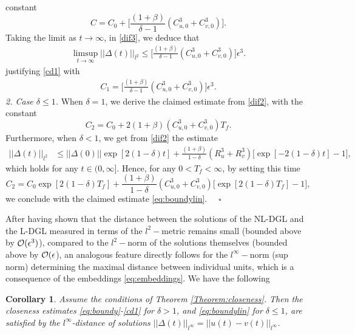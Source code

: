 \documentclass[preprintnumbers,amsmath,amssymb]{revtex4}
\newtheorem{corollary}{Corollary}[section]
\begin{document}
constant 
\begin{equation}
\label{cdc0}
C=C_0+\bigg[\frac{(1+\beta)}{\delta-1}(C_{u,0}^3+C_{v,0}^3)\bigg].
\end{equation}
Taking the limit as $t\rightarrow\infty$,  in \eqref{dif3}, we deduce that
\begin{eqnarray*}
\limsup_{t\rightarrow\infty}||\Delta(t)||_{l^2}\leq \bigg[\frac{(1+\beta)}{\delta-1}(C_{u,0}^3+C_{v,0}^3)\bigg]\epsilon^3.
\end{eqnarray*}
justifying \eqref{cd1} with
\begin{eqnarray}
\label{cdc}
C_1=\bigg[\frac{(1+\beta)}{\delta-1}(C_{u,0}^3+C_{v,0}^3)\bigg]\epsilon^3.
\end{eqnarray}
\textit{2. Case $\delta\leq 1$.}  When $\delta=1$, we derive the claimed estimate from \eqref{dif2}, with the constant 
\begin{equation*}
C_2=C_0+2(1+\beta)(C_{u,0}^3+C_{v,0}^3)T_f.
\end{equation*}
Furthermore, when $\delta<1$, we get from \eqref{dif2} the estimate
\begin{equation}
	\label{dif40}
\begin{split}
||\Delta(t)||_{l^2}&\leq ||\Delta (0)||\exp[2(1-\delta)t]+\frac{(1+\beta)}{1-\delta}(R^3_u+R^3_v)\big[\exp[-2(1-\delta)t]-1\big],
\end{split}
\end{equation}
which holds for any $t\in (0,\infty]$.  Hence, for any $0<T_f<\infty$, by setting  this time
\begin{equation}
\label{dif4}
C_2=C_0\exp[2(1-\delta)T_f]+\frac{(1+\beta)}{1-\delta}(C_{u,0}^3+C_{v,0}^3)\big[\exp[2(1-\delta)T_f]-1\big],
\end{equation}
we conclude with the claimed  estimate \eqref{eq:boundylin}. \ \  $\square$

After having shown that the distance between the solutions of the 
NL-DGL and the L-DGL measured in terms of the $l^2-$metric remains small (bounded above by ${\cal{O}}(\epsilon^3)$), compared to the $l^2-$norm of the solutions themselves (bounded above by ${\cal{O}}(\epsilon$), an analogous feature directly follows for the $l^{\infty}-$norm (sup norm) 
determining the maximal distance between individual units, which is a consequence of the embeddings \eqref{eq:embeddings}. We have  the following
\begin{corollary}
	\label{infdist}
Assume the conditions of Theorem \ref{Theorem:closeness}. Then the closeness estimates \eqref{eq:boundy}-\eqref{cd1} for $\delta>1$, and \eqref{eq:boundylin} for $\delta\leq 1$, are satisfied by the $l^{\infty}$-distance of solutions $||\Delta(t)||_{l^{\infty}}=||u(t)-v(t)||_{l^{\infty}}$.	
\end{corollary}
\end{document}
